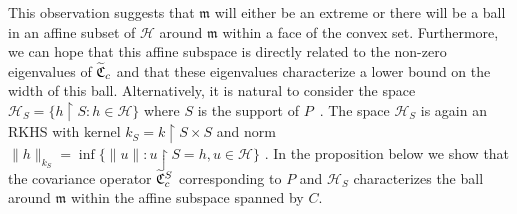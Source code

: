 \documentclass[10pt]{amsart}
\theoremstyle{definition}\newtheorem{defi}[theo]{Definition}\newtheorem{rema}[theo]{Remark}\newtheorem{exam}[theo]{Example}\newtheorem{exem}[theo]{Example}\newtheorem{nota}[theo]{Notation}
\theoremstyle{remark}
\newcommand{\restrr}
{\!\!\upharpoonright\!\!}
\newcommand{\cH}{\mathcal{H}}
\newcommand{\fkC}{\mathfrak{C}}
\newcommand{\mean}{\mathfrak{m}}
\let\oldtilde\tilde
\renewcommand*{\tilde}[1]{\mathchoice{\widetilde{#1}}{\widetilde{#1}}{\oldtilde{#1}}{\oldtilde{#1}}}
\begin{document}
This observation suggests that $\mean$ will either be an extreme or there will be a ball in an affine subset of $\cH$ around $\mean$ within a face of the convex set. Furthermore, we can hope that this affine subspace is directly related to the non-zero eigenvalues of $\tilde{\fkC}_c$ and that these eigenvalues characterize a lower bound on the width of this ball. Alternatively, it is natural to consider the space $\cH_S = \{ h\restrr S : h \in \cH \}$ where $S$ is the support of $P$~\cite[Definition~411N]{FREM}. The space $\cH_S$ is again an RKHS with kernel $k_S = k\restrr S \times S$ and norm $\|h\|_{k_S} = \inf\{\|u\| : u \restrr S = h, u \in \cH\}$ \cite[Corollary~5.8]{PAUL16}. In the proposition below we show that the covariance operator $\tilde{\fkC}_c^S$ corresponding to $P$ and $\cH_S$ characterizes the ball around $\mean$ within the affine subspace spanned by $C$.
\end{document}
